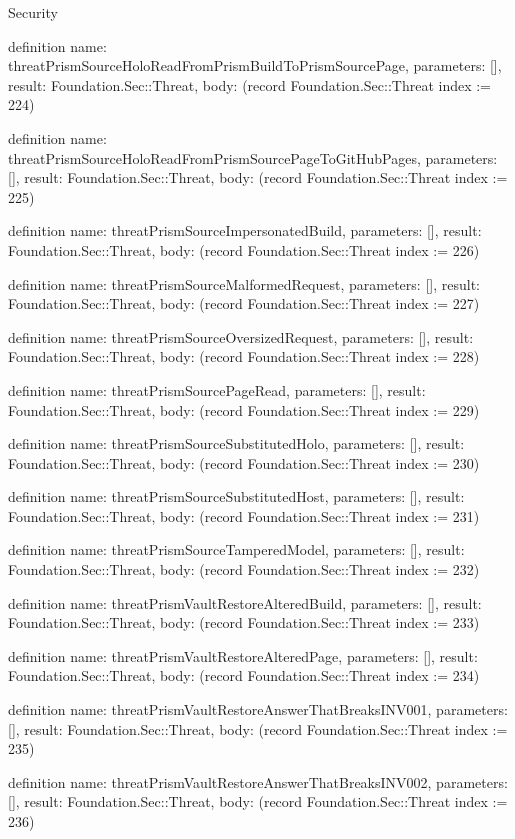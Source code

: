 \begin{lexlean}{Security}
\begin{semanticmodule}
definition{
  name: threatPrismSourceHoloReadFromPrismBuildToPrismSourcePage,
  parameters: [],
  result: Foundation.Sec::Threat,
  body: (record Foundation.Sec::Threat {index := 224})
}

definition{
  name: threatPrismSourceHoloReadFromPrismSourcePageToGitHubPages,
  parameters: [],
  result: Foundation.Sec::Threat,
  body: (record Foundation.Sec::Threat {index := 225})
}

definition{
  name: threatPrismSourceImpersonatedBuild,
  parameters: [],
  result: Foundation.Sec::Threat,
  body: (record Foundation.Sec::Threat {index := 226})
}

definition{
  name: threatPrismSourceMalformedRequest,
  parameters: [],
  result: Foundation.Sec::Threat,
  body: (record Foundation.Sec::Threat {index := 227})
}

definition{
  name: threatPrismSourceOversizedRequest,
  parameters: [],
  result: Foundation.Sec::Threat,
  body: (record Foundation.Sec::Threat {index := 228})
}

definition{
  name: threatPrismSourcePageRead,
  parameters: [],
  result: Foundation.Sec::Threat,
  body: (record Foundation.Sec::Threat {index := 229})
}

definition{
  name: threatPrismSourceSubstitutedHolo,
  parameters: [],
  result: Foundation.Sec::Threat,
  body: (record Foundation.Sec::Threat {index := 230})
}

definition{
  name: threatPrismSourceSubstitutedHost,
  parameters: [],
  result: Foundation.Sec::Threat,
  body: (record Foundation.Sec::Threat {index := 231})
}

definition{
  name: threatPrismSourceTamperedModel,
  parameters: [],
  result: Foundation.Sec::Threat,
  body: (record Foundation.Sec::Threat {index := 232})
}

definition{
  name: threatPrismVaultRestoreAlteredBuild,
  parameters: [],
  result: Foundation.Sec::Threat,
  body: (record Foundation.Sec::Threat {index := 233})
}

definition{
  name: threatPrismVaultRestoreAlteredPage,
  parameters: [],
  result: Foundation.Sec::Threat,
  body: (record Foundation.Sec::Threat {index := 234})
}

definition{
  name: threatPrismVaultRestoreAnswerThatBreaksINV001,
  parameters: [],
  result: Foundation.Sec::Threat,
  body: (record Foundation.Sec::Threat {index := 235})
}

definition{
  name: threatPrismVaultRestoreAnswerThatBreaksINV002,
  parameters: [],
  result: Foundation.Sec::Threat,
  body: (record Foundation.Sec::Threat {index := 236})
}


\end{semanticmodule}
\end{lexlean}
